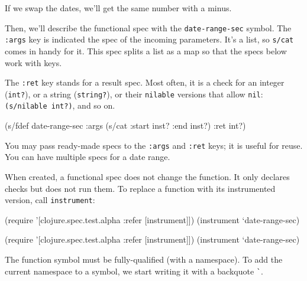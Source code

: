 \noindent
If we swap the dates, we'll get the same number with a minus.

Then, we'll describe the functional spec with the \verb|date-range-sec| symbol. The \verb|:args| key is indicated the spec of the incoming parameters. It's a list, so \verb|s/cat| comes in handy for it. This spec splits a list as a map so that the specs below work with keys.

The \verb|:ret| key stands for a result spec. Most often, it is a check for an integer (\verb|int?|), or a string (\verb|string?|), or their \verb|nilable| versions that allow \verb|nil|: \verb|(s/nilable int?)|, and so on.


\begin{english}
  \begin{clojure}
(s/fdef date-range-sec
  :args (s/cat :start inst? :end inst?)
  :ret int?)
  \end{clojure}
\end{english}

You may pass ready-made specs to the \verb|:args| and \verb|:ret| keys; it is useful for reuse. You can have multiple specs for a date range.

When created, a functional spec does not change the function. It only declares checks but does not run them. To replace a function with its instrumented version, call \verb|instrument|:

\ifx\DEVICETYPE\MOBILE

\begin{english}
  \begin{clojure}
(require '[clojure.spec.test.alpha
           :refer [instrument]])
(instrument `date-range-sec)
  \end{clojure}
\end{english}

\else

\begin{english}
  \begin{clojure}
(require '[clojure.spec.test.alpha :refer [instrument]])
(instrument `date-range-sec)
  \end{clojure}
\end{english}

\fi


The function symbol must be fully-qualified (with a namespace). To add the current namespace to a symbol, we start writing it with a backquote \verb|`|.

